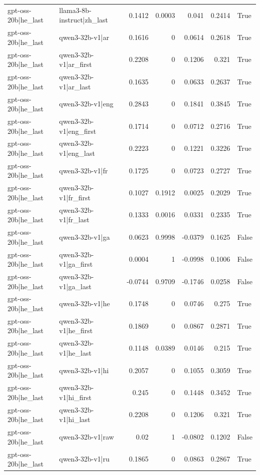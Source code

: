 \begin{table}
\begin{tabular}{l l r r r r l}
gpt-oss-20b|he_last & llama3-8b-instruct|zh_last & 0.1412 & 0.0003 & 0.041 & 0.2414 & True \\
gpt-oss-20b|he_last & qwen3-32b-v1|ar & 0.1616 & 0 & 0.0614 & 0.2618 & True \\
gpt-oss-20b|he_last & qwen3-32b-v1|ar_first & 0.2208 & 0 & 0.1206 & 0.321 & True \\
gpt-oss-20b|he_last & qwen3-32b-v1|ar_last & 0.1635 & 0 & 0.0633 & 0.2637 & True \\
gpt-oss-20b|he_last & qwen3-32b-v1|eng & 0.2843 & 0 & 0.1841 & 0.3845 & True \\
gpt-oss-20b|he_last & qwen3-32b-v1|eng_first & 0.1714 & 0 & 0.0712 & 0.2716 & True \\
gpt-oss-20b|he_last & qwen3-32b-v1|eng_last & 0.2223 & 0 & 0.1221 & 0.3226 & True \\
gpt-oss-20b|he_last & qwen3-32b-v1|fr & 0.1725 & 0 & 0.0723 & 0.2727 & True \\
gpt-oss-20b|he_last & qwen3-32b-v1|fr_first & 0.1027 & 0.1912 & 0.0025 & 0.2029 & True \\
gpt-oss-20b|he_last & qwen3-32b-v1|fr_last & 0.1333 & 0.0016 & 0.0331 & 0.2335 & True \\
gpt-oss-20b|he_last & qwen3-32b-v1|ga & 0.0623 & 0.9998 & -0.0379 & 0.1625 & False \\
gpt-oss-20b|he_last & qwen3-32b-v1|ga_first & 0.0004 & 1 & -0.0998 & 0.1006 & False \\
gpt-oss-20b|he_last & qwen3-32b-v1|ga_last & -0.0744 & 0.9709 & -0.1746 & 0.0258 & False \\
gpt-oss-20b|he_last & qwen3-32b-v1|he & 0.1748 & 0 & 0.0746 & 0.275 & True \\
gpt-oss-20b|he_last & qwen3-32b-v1|he_first & 0.1869 & 0 & 0.0867 & 0.2871 & True \\
gpt-oss-20b|he_last & qwen3-32b-v1|he_last & 0.1148 & 0.0389 & 0.0146 & 0.215 & True \\
gpt-oss-20b|he_last & qwen3-32b-v1|hi & 0.2057 & 0 & 0.1055 & 0.3059 & True \\
gpt-oss-20b|he_last & qwen3-32b-v1|hi_first & 0.245 & 0 & 0.1448 & 0.3452 & True \\
gpt-oss-20b|he_last & qwen3-32b-v1|hi_last & 0.2208 & 0 & 0.1206 & 0.321 & True \\
gpt-oss-20b|he_last & qwen3-32b-v1|raw & 0.02 & 1 & -0.0802 & 0.1202 & False \\
gpt-oss-20b|he_last & qwen3-32b-v1|ru & 0.1865 & 0 & 0.0863 & 0.2867 & True \\

\end{tabular}
\end{table}
